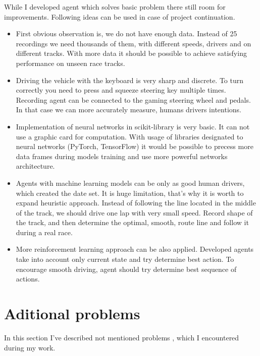 \documentclass[declaration,shortabstract,english,inz]{iithesis}
\begin{document}
While I developed agent which solves basic problem there still room for improvements.
Following ideas can be used in case of project continuation.
\begin{itemize}
    \item First obvious observation is, we do not have enough data.
Instead of 25 recordings we need thousands of them, with different speeds, drivers and on different tracks.
With more data it should be possible to achieve satisfying performance on unseen race tracks.

    \item Driving the vehicle with the keyboard is very sharp and discrete.
To turn correctly you need to press and squeeze steering key multiple times.
Recording agent can be connected to the gaming steering wheel and pedals.
In that case we can more accurately measure, humans drivers intentions.

    \item Implementation of neural networks in scikit-library is very basic.
It can not use a graphic card for computation.
With usage of libraries designated to neural networks (PyTorch, TensorFlow) it would be possible to precess more data frames during models training and use more  powerful networks architecture.
    \item Agents with machine learning models  can be only as good human drivers, which created the date set.
It is huge limitation, that's why it is worth to expand heuristic approach.
Instead of following the line located in the middle of the track, we should drive one lap with very small speed.
Record shape of the track, and then determine the optimal, smooth, route line and follow it during a real race.

    \item More reinforcement learning approach can be also applied.
Developed agents take into account only current state and try determine best action.
To encourage smooth driving, agent should try determine best sequence of actions.
\end{itemize}



\section{Aditional problems}
In this section I've described not mentioned problems , which I encountered during my work.
 
\end{document}
